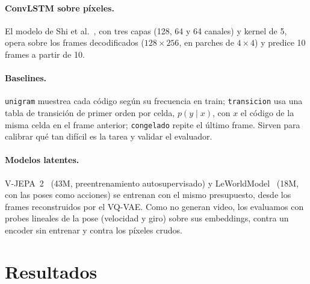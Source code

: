 \documentclass[10pt,twocolumn,a4paper]{article}
\DeclareRobustCommand{\editado}[1]{\textcolor{editado}{#1}}
\DeclareRobustCommand{\editado}[1]{#1}
\begin{document}
\paragraph{ConvLSTM sobre píxeles.} El modelo de Shi et al.~\cite{shi2015convlstm}, con tres capas (128, 64 y 64 canales) y kernel de 5, opera sobre los frames decodificados ($128\times256$, en parches de $4\times4$) y predice 10 frames a partir de 10.

\paragraph{Baselines.} \texttt{unigram} muestrea cada código según su frecuencia en train; \texttt{transicion} usa una tabla de transición de primer orden por celda, $p(y\mid x)$, con $x$ el código de la misma celda en el frame anterior; \texttt{congelado} repite el último frame. Sirven para calibrar qué tan difícil es la tarea y validar el evaluador.

\paragraph{Modelos latentes.} V-JEPA~2~\cite{assran2025vjepa2} (43M, preentrenamiento autosupervisado) y LeWorldModel~\cite{maes2026lewm} (18M, con las poses como acciones) se entrenan con el mismo presupuesto, desde los frames reconstruidos por el VQ-VAE. Como no generan video, los evaluamos con probes lineales de la pose (velocidad y giro) sobre sus embeddings, contra un encoder sin entrenar y contra los píxeles crudos.

\section{Resultados}
\label{sec:resultados}


\begin{table}[t]
\centering
\small
\resizebox{\textwidth}{!}{}
\caption{Calidad y latencia de todos los modelos sobre los mismos 400 clips de validación. CE: cross-entropy por token en validación (solo autoregresivos). FVD con features de I3D sobre la ventana de 16 frames que termina a 1, 2 y 3~s; IC del 95\,\% por bootstrap por segmento. \emph{Drift}: cociente entre el FVD a 3~s y a 1~s. Latencia: p50 del modelo solo, batch~1, fp16 con CUDA graphs \editado{(ConvLSTM y transición: fp32 sin graphs)}, en la RTX 3080 Ti.}
\label{tab:principal}
\end{table}
\end{document}
